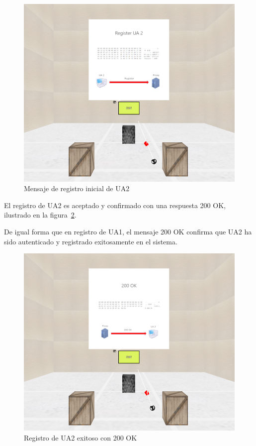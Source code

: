 \documentclass[a4paper, 12pt]{book}
\begin{document}
\begin{figure}[H]
  \centering
  \includegraphics[width=12cm, keepaspectratio]{img/resultados/03-Register_UA2.PNG}
  \caption{Mensaje de registro inicial de UA2}
  \label{fig:04-Register_UA2}
\end{figure}
\clearpage

El registro de UA2 es aceptado y confirmado con una respuesta 200 OK, ilustrado en la figura~\ref{fig:05-200OK_UA2}. 

De igual forma que en registro de UA1, el mensaje 200 OK confirma que UA2 ha sido autenticado y registrado exitosamente en el sistema.

\bigskip

\begin{figure}[H]
  \centering
  \includegraphics[width=12cm, keepaspectratio]{img/resultados/04-200OK.PNG}
  \caption{Registro de UA2 exitoso con 200 OK}
  \label{fig:05-200OK_UA2}
\end{figure}
\clearpage
\end{document}
